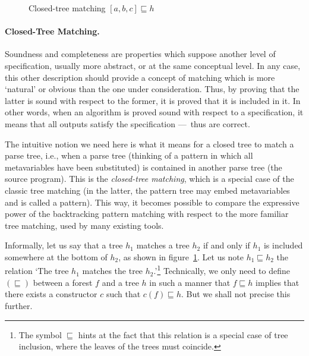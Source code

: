 

\begin{figure}[H]
\caption{Closed\hyp{}tree matching \([a,b,c] \sqsubseteq h\)}
\label{fig:sqsubseteq}
\end{figure}

\paragraph{Closed\hyp{}Tree Matching.}

Soundness and completeness are properties which suppose another level
of specification, usually more abstract, or at the same conceptual
level. In any case, this other description should provide a concept of
matching which is more `natural' or obvious than the one under
consideration. Thus, by proving that the latter is sound with respect
to the former, it is proved that it is included in it. In other words,
when an algorithm is proved sound with respect to a specification, it
means that all outputs satisfy the specification ---~thus are correct.

The intuitive notion we need here is what it means for a closed tree
to match a parse tree, i.e., when a parse tree (thinking of a pattern
in which all meta\-variables have been substituted) is contained in
another parse tree (the source program). This is the
\emph{closed\hyp{}tree matching}, which is a special case of the
classic tree matching (in the latter, the pattern tree may embed
meta\-variables and is called a pattern). This way, it becomes
possible to compare the expressive power of the backtracking pattern
matching with respect to the more familiar tree matching, used by many
existing tools.

Informally, let us say that a tree \(h_1\) matches a tree \(h_2\) if
and only if \(h_1\) is included somewhere at the bottom of \(h_2\), as
shown in figure~\ref{fig:sqsubseteq}. Let us note \(h_1 \sqsubseteq
h_2\) the relation `The tree \(h_1\) matches the tree
\(h_2\).'\footnote{The symbol \(\sqsubseteq\) hints at the fact that
this relation is a special case of tree inclusion, where the leaves of
the trees must coincide.} Technically, we only need to define
\((\sqsubseteq)\) between a forest \(f\) and a tree \(h\) in such a
manner that \(f \sqsubseteq h\) implies that there exists a
constructor \(c\) such that \(c(f) \sqsubseteq h\). But we shall not
precise this further.

